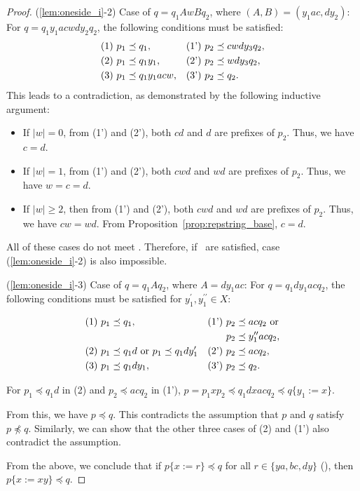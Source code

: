 \begin{proof}
\smallskip

\noindent
(\ref{lem:oneside_i}-2) Case of $q=q_{1}AwBq_{2}$, where {\color{black}$( A,B ) = ( y_{1}ac,dy_{2} )$}:
For $q=q_{1}y_{1}acwdy_{2}q_{2}$, the following conditions must be satisfied:
\begin{align*}
  \textrm{(1)}~& p_{1} \preceq q_{1}, & \textrm{(1')}~& p_{2} \preceq cwdy_{3}q_{2}, \\
  \textrm{(2)}~& p_{1} \preceq q_{1}y_{1}, & \textrm{(2')}~& p_{2} \preceq wdy_{3}q_{2}, \\
  \textrm{(3)}~& p_{1} \preceq {\color{black}q_{1}y_{1}acw}, & \textrm{(3')}~& p_{2} \preceq q_{2}.
\end{align*}
\noindent
{\color{black} This leads to a contradiction, as demonstrated by the following inductive argument:}
\begin{itemize}
\item If $|w|=0$, from (1') and (2'), {\color{black} both $cd$ and $d$ are prefixes of $p_{2}$}. Thus, we have $c=d$.
\item If $|w|=1$, from (1') and (2'), {\color{black} both $cwd$ and $wd$ are prefixes of $p_{2}$}. Thus, we have $w=c=d$.
\item If $|w| \ge 2$, then from (1') and (2'), {\color{black}both} $cwd$ and $wd$ are prefixes of $p_{2}$. Thus, we have $cw=wd$. From Proposition~\ref{prop:repstring_base}, $c=d$.
\end{itemize}
All of these cases do not meet \TheConditionB.
Therefore, if \TheConditionB\ are satisfied, case (\ref{lem:oneside_i}-2) is also impossible.

\smallskip

\noindent
(\ref{lem:oneside_i}-3) Case of $q=q_{1}Aq_{2}$, where $A = dy_{1}ac$:
For $q=q_{1}dy_{1}acq_{2}$, the following conditions must be satisfied for $y_{1}^{\prime},y_{1}^{\prime\prime}\in X$:
{\color{black}
\begin{align*}
  \textrm{(1)}~& p_{1} \preceq q_{1}, & \textrm{(1')}~& p_{2} \preceq acq_{2} \mbox{~or}\\
  & & & p_{2} \preceq y_{1}^{\prime\prime}acq_{2},\\
  \textrm{(2)}~& p_{1} \preceq q_{1}d \mbox{~or~} p_{1} \preceq q_{1}dy_{1}^{\prime} & \textrm{(2')}~& p_{2} \preceq {\color{black} acq_{2}}, \\
  \textrm{(3)}~& p_{1} \preceq q_{1}dy_{1}, & \textrm{(3')}~& p_{2} \preceq q_{2}. 
  \end{align*}

For $p_{1} \preceq q_{1}d$ in (2) and $p_{2} \preceq acq_{2}$ in (1'), $p = p_{1}xp_{2} \preceq q_{1}dxacq_{2} \preceq q\{y_{1}:=x\}$. }
{\color{black}
From this, we have $p\preceq q$.
This contradicts the assumption that $p$ and $q$ satisfy 
  $p\not\preceq q$.}
Similarly, we can show that {\color{black}the other three cases} of (2) and (1') also contradict the assumption.

From the above, we conclude that if $p \{ x := r \} \preceq q$ for all $r \in \{ ya, bc, dy \}$ (\TheConditionB), then $p \{ x := xy \} \preceq q$.
\end{proof}


